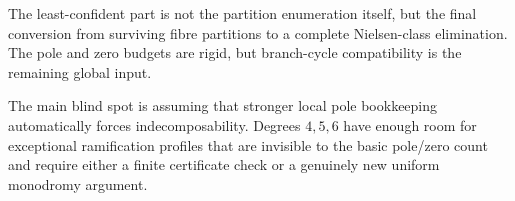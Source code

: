 \begin{remark}
The least-confident part is not the partition enumeration itself, but the final conversion from surviving fibre partitions to a complete Nielsen-class elimination. The pole and zero budgets are rigid, but branch-cycle compatibility is the remaining global input.
\end{remark}

\begin{remark}
The main blind spot is assuming that stronger local pole bookkeeping automatically forces indecomposability. Degrees $4,5,6$ have enough room for exceptional ramification profiles that are invisible to the basic pole/zero count and require either a finite certificate check or a genuinely new uniform monodromy argument.
\end{remark}

